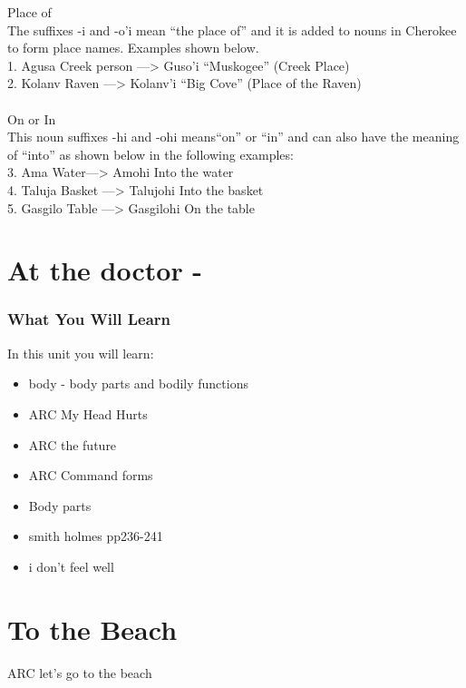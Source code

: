 \begin{multicols}
\noindent Place of\\
The suffixes -i and -o’i mean “the place of” and it is added to nouns in Cherokee to form place names. Examples shown below.\\
1. Agusa Creek person —>  Guso’i “Muskogee” (Creek Place)\\
2. Kolanv Raven —> Kolanv’i “Big Cove” (Place of the Raven)\\\\

On or In\\
This noun suffixes -hi and -ohi means“on” or “in” and can also have the meaning of “into” as shown below in the following examples:\\
3. Ama Water—> Amohi Into the water\\
4. Taluja Basket —>  Talujohi Into the basket\\
5. Gasgilo Table —>  Gasgilohi On the table\\
\cite{walcpp88}
\index{}
\chapter{At the doctor - }
\subsection{What You Will Learn}
In this unit you will learn:
\begin{itemize}
\item body - body parts and bodily functions
\item ARC My Head Hurts
\item ARC the future
\item ARC Command forms
\item Body parts
\item smith holmes pp236-241
\item i don't feel well
\end{itemize}\newpage

\newpage{}
\chapter{To the Beach}
ARC let's go to the beach\\
\index{}

\end{multicols}
